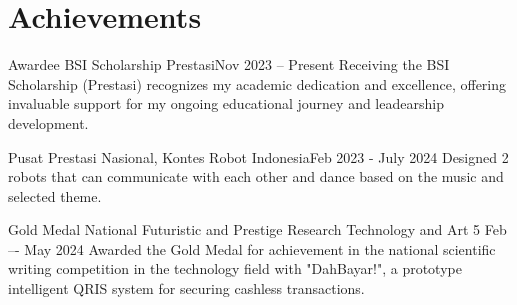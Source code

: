 \section{Achievements}
\resumeSubHeadingListStart
    
    \achiSubheading
    {Awardee BSI Scholarship Prestasi}{Nov 2023 -- Present}
    {Receiving the BSI Scholarship (Prestasi) recognizes my academic dedication and excellence, offering invaluable support for my ongoing educational journey and leadearship development.}{}

    \achiSubheading
    {Pusat Prestasi Nasional, Kontes Robot Indonesia}{Feb 2023 - July 2024}
    {Designed 2 robots that can communicate with each other and dance based on the music and selected theme.}{}
    \resumeItemListStart
    \resumeItemListEnd

    \achiSubheading
    {Gold Medal National Futuristic and Prestige Research Technology and Art 5 }{Feb –- May 2024}
    {Awarded the Gold Medal for achievement in the national scientific writing competition in the technology field with "DahBayar!", a prototype intelligent QRIS system for securing cashless transactions.}{}
    


\resumeSubHeadingListEnd